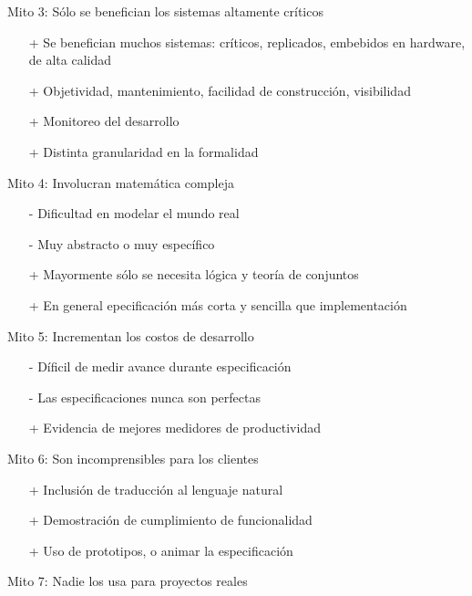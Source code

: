 \documentclass{beamer}
\begin{document}
\begin{frame}{Mito 3: S\'olo se benefician los sistemas altamente cr\'iticos}
\begin{itemize}[<+->]
\item[+] Se benefician muchos sistemas: cr\'iticos, replicados, embebidos en hardware, de alta calidad
\item[+] Objetividad, mantenimiento, facilidad de construcci\'on, visibilidad 
\item[+] Monitoreo del desarrollo
\item[+] Distinta granularidad en la formalidad
\end{itemize}
\end{frame}
 
\begin{frame}{Mito 4: Involucran matem\'atica compleja}
\begin{itemize}[<+->]
\item[-] Dificultad en modelar el mundo real
\item[-] Muy abstracto o muy espec\'ifico 
\item[+] Mayormente sólo se necesita l\'ogica y teor\'ia de conjuntos
\item[+] En general epecificaci\'on m\'as corta y sencilla que implementaci\'on
\end{itemize}
\end{frame}
 
\begin{frame}{Mito 5: Incrementan los costos de desarrollo}
\begin{itemize}[<+->]
\item[-] D\'ificil de medir avance durante especificaci\'on{}
\item[-] Las especificaciones nunca son perfectas
\item[+] Evidencia de mejores medidores de productividad
\end{itemize}
\end{frame}
 
\begin{frame}{Mito 6: Son incomprensibles para los clientes}
\begin{itemize}[<+->]
\item[+] Inclusi\'on de traducci\'on al lenguaje natural
\item[+] Demostraci\'on de cumplimiento de funcionalidad
\item[+] Uso de prototipos, o animar la especificaci\'on
\end{itemize}
\end{frame}
 
\begin{frame}{Mito 7: Nadie los usa para proyectos reales}
\end{frame}
\end{document}
